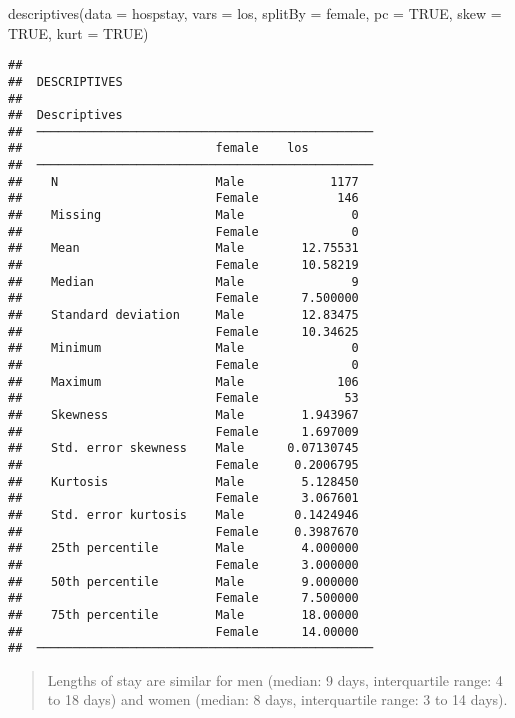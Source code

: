 \documentclass[
]{memoir}
\newenvironment{Shaded}{\begin{snugshade}}{\end{snugshade}}
\newcommand{\AttributeTok}[1]{\textcolor[rgb]{0.77,0.63,0.00}{#1}}
\newcommand{\ConstantTok}[1]{\textcolor[rgb]{0.00,0.00,0.00}{#1}}
\newcommand{\FunctionTok}[1]{\textcolor[rgb]{0.00,0.00,0.00}{#1}}
\newcommand{\NormalTok}[1]{#1}
\begin{document}
\begin{Shaded}
\begin{Highlighting}[]
\FunctionTok{descriptives}\NormalTok{(}\AttributeTok{data =}\NormalTok{ hospstay,}
             \AttributeTok{vars =}\NormalTok{ los,}
             \AttributeTok{splitBy =}\NormalTok{ female,}
             \AttributeTok{pc =} \ConstantTok{TRUE}\NormalTok{,}
             \AttributeTok{skew =} \ConstantTok{TRUE}\NormalTok{,}
             \AttributeTok{kurt =} \ConstantTok{TRUE}\NormalTok{)}
\end{Highlighting}
\end{Shaded}

\begin{verbatim}
## 
##  DESCRIPTIVES
## 
##  Descriptives                                    
##  ─────────────────────────────────────────────── 
##                           female    los          
##  ─────────────────────────────────────────────── 
##    N                      Male            1177   
##                           Female           146   
##    Missing                Male               0   
##                           Female             0   
##    Mean                   Male        12.75531   
##                           Female      10.58219   
##    Median                 Male               9   
##                           Female      7.500000   
##    Standard deviation     Male        12.83475   
##                           Female      10.34625   
##    Minimum                Male               0   
##                           Female             0   
##    Maximum                Male             106   
##                           Female            53   
##    Skewness               Male        1.943967   
##                           Female      1.697009   
##    Std. error skewness    Male      0.07130745   
##                           Female     0.2006795   
##    Kurtosis               Male        5.128450   
##                           Female      3.067601   
##    Std. error kurtosis    Male       0.1424946   
##                           Female     0.3987670   
##    25th percentile        Male        4.000000   
##                           Female      3.000000   
##    50th percentile        Male        9.000000   
##                           Female      7.500000   
##    75th percentile        Male        18.00000   
##                           Female      14.00000   
##  ───────────────────────────────────────────────
\end{verbatim}

\begin{quote}
Lengths of stay are similar for men (median: 9 days, interquartile range: 4 to 18 days) and women (median: 8 days, interquartile range: 3 to 14 days).
\end{quote}
\end{document}
